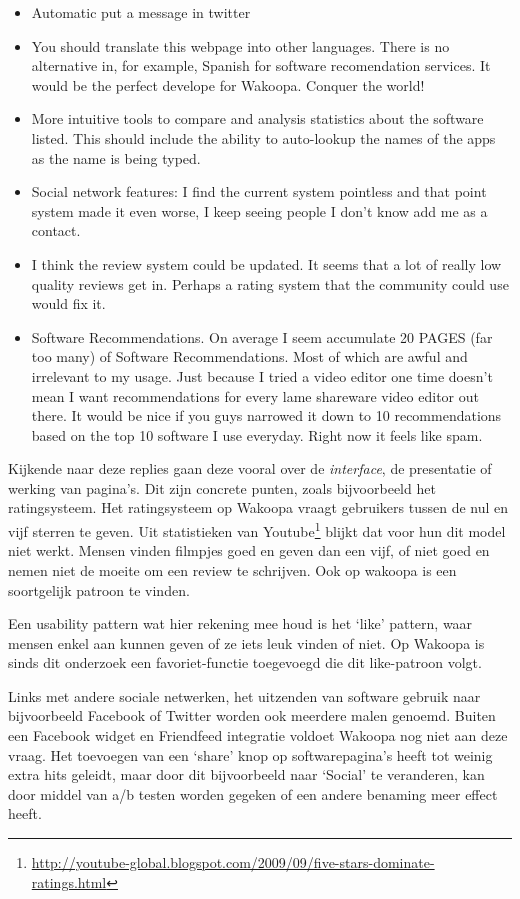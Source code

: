 \documentclass[a4paper, 10pt, pdftex]{report}
\begin{document}
      \begin{itemize}
      \item Automatic put a message in twitter
      \item You should translate this webpage into other languages. There is no alternative in, for example, Spanish for software recomendation services. It would be the perfect develope for Wakoopa. Conquer the world!
      \item More intuitive tools to compare and analysis statistics about the software listed. This should include the ability to auto-lookup the names of the apps as the name is being typed.
      \item Social network features: I find the current system pointless and that point system made it even worse, I keep seeing people I don't know add me as a contact.
      \item I think the review system could be updated. It seems that a lot of really low quality reviews get in. Perhaps a rating system that the community could use would fix it.
      \item Software Recommendations. On average I seem accumulate 20 PAGES (far too many) of Software Recommendations. Most of which are awful and irrelevant to my usage. Just because I tried a video editor one time doesn't mean I want recommendations for every lame shareware video editor out there. It would be nice if you guys narrowed it down to 10 recommendations based on the top 10 software I use everyday. Right now it feels like spam.
      \end{itemize}

      Kijkende naar deze replies gaan deze vooral over de \emph{interface}, de presentatie of werking van pagina's. Dit zijn concrete punten, zoals bijvoorbeeld het ratingsysteem. Het ratingsysteem op Wakoopa vraagt gebruikers tussen de nul en vijf sterren te geven. Uit statistieken van Youtube\footnote{\url{http://youtube-global.blogspot.com/2009/09/five-stars-dominate-ratings.html}} blijkt dat voor hun dit model niet werkt. Mensen vinden filmpjes goed en geven dan een vijf, of niet goed en nemen niet de moeite om een review te schrijven. Ook op wakoopa is een soortgelijk patroon te vinden.

      Een usability pattern wat hier rekening mee houd is het `like' pattern, waar mensen enkel aan kunnen geven of ze iets leuk vinden of niet. Op Wakoopa is sinds dit onderzoek een favoriet-functie toegevoegd die dit like-patroon volgt.

      Links met andere sociale netwerken, het uitzenden van software gebruik naar bijvoorbeeld Facebook of Twitter worden ook meerdere malen genoemd. Buiten een Facebook widget en Friendfeed integratie voldoet Wakoopa nog niet aan deze vraag. Het toevoegen van een `share' knop op softwarepagina's heeft tot weinig extra hits geleidt, maar door dit bijvoorbeeld naar `Social' te veranderen, kan door middel van a/b testen worden gegeken of een andere benaming meer effect heeft.
\end{document}
